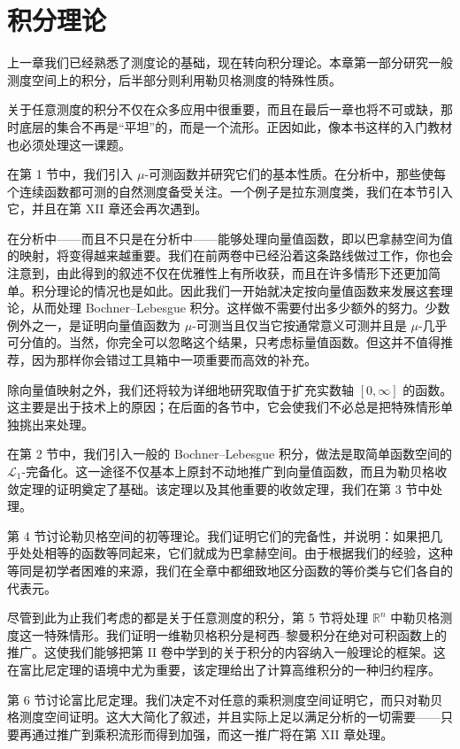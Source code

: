 \chapter{积分理论}
上一章我们已经熟悉了测度论的基础，现在转向积分理论。本章第一部分研究一般测度空间上的积分，后半部分则利用勒贝格测度的特殊性质。

关于任意测度的积分不仅在众多应用中很重要，而且在最后一章也将不可或缺，那时底层的集合不再是“平坦”的，而是一个流形。正因如此，像本书这样的入门教材也必须处理这一课题。

在第 1 节中，我们引入 $ \mu $-可测函数并研究它们的基本性质。在分析中，那些使每个连续函数都可测的自然测度备受关注。一个例子是拉东测度类，我们在本节引入它，并且在第 XII 章还会再次遇到。

在分析中——而且不只是在分析中——能够处理向量值函数，即以巴拿赫空间为值的映射，将变得越来越重要。我们在前两卷中已经沿着这条路线做过工作，你也会注意到，由此得到的叙述不仅在优雅性上有所收获，而且在许多情形下还更加简单。积分理论的情况也是如此。因此我们一开始就决定按向量值函数来发展这套理论，从而处理 Bochner–Lebesgue 积分。这样做不需要付出多少额外的努力。少数例外之一，是证明向量值函数为 $ \mu $-可测当且仅当它按通常意义可测并且是 $ \mu $-几乎可分值的。当然，你完全可以忽略这个结果，只考虑标量值函数。但这并不值得推荐，因为那样你会错过工具箱中一项重要而高效的补充。

除向量值映射之外，我们还将较为详细地研究取值于扩充实数轴 $ [0,\infty] $ 的函数。这主要是出于技术上的原因；在后面的各节中，它会使我们不必总是把特殊情形单独挑出来处理。

在第 2 节中，我们引入一般的 Bochner–Lebesgue 积分，做法是取简单函数空间的 $ \mathcal{L}_1 $-完备化。这一途径不仅基本上原封不动地推广到向量值函数，而且为勒贝格收敛定理的证明奠定了基础。该定理以及其他重要的收敛定理，我们在第 3 节中处理。

第 4 节讨论勒贝格空间的初等理论。我们证明它们的完备性，并说明：如果把几乎处处相等的函数等同起来，它们就成为巴拿赫空间。由于根据我们的经验，这种等同是初学者困难的来源，我们在全章中都细致地区分函数的等价类与它们各自的代表元。

尽管到此为止我们考虑的都是关于任意测度的积分，第 5 节将处理 $ \mathbb{R}^n $ 中勒贝格测度这一特殊情形。我们证明一维勒贝格积分是柯西–黎曼积分在绝对可积函数上的推广。这使我们能够把第 II 卷中学到的关于积分的内容纳入一般理论的框架。这在富比尼定理的语境中尤为重要，该定理给出了计算高维积分的一种归约程序。

第 6 节讨论富比尼定理。我们决定不对任意的乘积测度空间证明它，而只对勒贝格测度空间证明。这大大简化了叙述，并且实际上足以满足分析的一切需要——只要再通过推广到乘积流形而得到加强，而这一推广将在第 XII 章处理。

